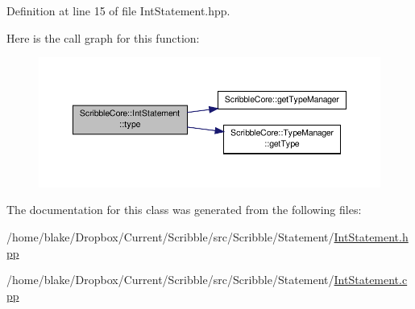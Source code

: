 Definition at line 15 of file Int\-Statement.\-hpp.



Here is the call graph for this function\-:
\nopagebreak
\begin{figure}[H]
\begin{center}
\leavevmode
\includegraphics[width=350pt]{class_scribble_core_1_1_int_statement_a2540aa15838b2a60ca2dbd943a342e83_cgraph}
\end{center}
\end{figure}




The documentation for this class was generated from the following files\-:\begin{DoxyCompactItemize}
\item 
/home/blake/\-Dropbox/\-Current/\-Scribble/src/\-Scribble/\-Statement/\hyperlink{_int_statement_8hpp}{Int\-Statement.\-hpp}\item 
/home/blake/\-Dropbox/\-Current/\-Scribble/src/\-Scribble/\-Statement/\hyperlink{_int_statement_8cpp}{Int\-Statement.\-cpp}\end{DoxyCompactItemize}
